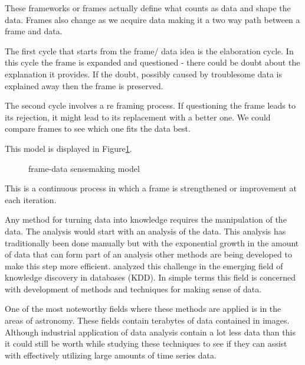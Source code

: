 These frameworks or frames actually define what counts as data and shape the data. Frames also change as we acquire data making it a two way path between a frame and data.

The first cycle that starts from the frame/ data idea is the elaboration cycle. In this cycle the frame is expanded and questioned - there could be doubt about the explanation it provides. If the doubt, possibly caused by troublesome data is explained away then the frame is preserved.

The second cycle involves a re framing process. If questioning the frame leads to its rejection, it might lead to its replacement with a better one. We could compare frames to see which one fits the data best. 

This model is displayed in Figure\ref{fig:4}.
\begin{figure}[!ht]
	\centering{}
	\caption{\cite{klein2006making} frame-data sensemaking model}\label{fig:4}
\end{figure}

This is a continuous process in which a frame is strengthened or improvement at each iteration.

Any method for turning data into knowledge requires the manipulation of the data. The analysis would start with an analysis of the data. This analysis has traditionally been done manually but with the exponential growth in the amount of data that can form part of an analysis other methods are being developed to make this step more efficient. \cite{fayyad1996data} analyzed this challenge in the emerging field of knowledge discovery in databases (KDD). In simple terms this field is concerned with development of methods and techniques for making sense of data.


One of the most noteworthy fields where these methods are applied is in the areas of astronomy. These fields contain terabytes of data contained in images. Although industrial application of data analysis contain a lot less data than this it could still be worth while studying these techniques to see if they can assist with effectively utilizing large amounts of time series data.

